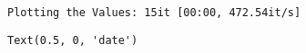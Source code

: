 \documentclass[11pt]{article}
\makeatletter
\newcommand{\boxspacing}{\kern\kvtcb@left@rule\kern\kvtcb@boxsep}
\newcommand{\prompt}[4]{
        {\ttfamily\llap{{\color{#2}[#3]:\hspace{3pt}#4}}\vspace{-\baselineskip}}
    }
\makeatother
\begin{document}
    \begin{Verbatim}[commandchars=\\\{\}]
Plotting the Values: 15it [00:00, 472.54it/s]
    \end{Verbatim}

            \begin{tcolorbox}[breakable, size=fbox, boxrule=.5pt, pad at break*=1mm, opacityfill=0]
\prompt{Out}{outcolor}{62}{\boxspacing}
\begin{Verbatim}[commandchars=\\\{\}]
Text(0.5, 0, 'date')
\end{Verbatim}
\end{tcolorbox}
        
    \begin{center}
    \end{center}
    { \hspace*{\fill} \\}
    
\end{document}
